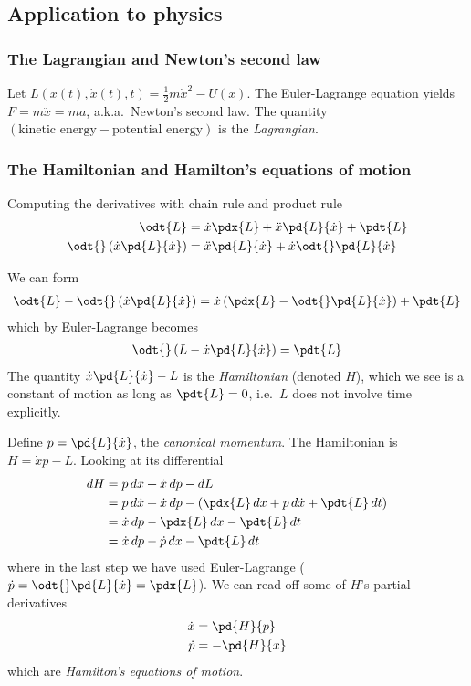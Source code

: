 \documentclass[12pt, oneside, letterpaper, fleqn]{article}
\begin{document}
\subsection{Application to physics}
\subsubsection{The Lagrangian and Newton's second law}
Let $L(x(t), \dot{x}(t), t) = \frac{1}{2}m\dot{x}^2 - U(x)$. The
Euler-Lagrange equation yields $F = m\ddot{x} = ma$, a.k.a.\ Newton's
second law. The quantity $(\text{kinetic energy} - \text{potential
energy})$ is the \emph{Lagrangian}.

\subsubsection{The Hamiltonian and Hamilton's equations of motion}
Computing the derivatives with chain rule and product rule
\begin{align*}
\odt{L} &= \dot{x}\pdx{L} + \ddot{x}\pd{L}{\dot{x}} + \pdt{L}\\
\odt{}\left(\dot{x}\pd{L}{\dot{x}}\right) &= \ddot{x}\pd{L}{\dot{x}} +
\dot{x}\odt{}\pd{L}{\dot{x}}
\end{align*}

We can form
\begin{align*}
\odt{L} - \odt{}\left(\dot{x}\pd{L}{\dot{x}}\right) =
\dot{x}\left(\pdx{L} - \odt{}\pd{L}{\dot{x}}\right) + \pdt{L}
\end{align*}
which by Euler-Lagrange becomes
\begin{align*}
\odt{}\left(L - \dot{x}\pd{L}{\dot{x}}\right) = \pdt{L}
\end{align*}
The quantity $\dot{x}\pd{L}{\dot{x}} - L$ is the
\emph{Hamiltonian} (denoted $H$), which we see is a constant of motion
as long as $\pdt{L} = 0$, i.e.\ $L$ does not involve time explicitly.

Define $p = \pd{L}{\dot{x}}$, the \emph{canonical momentum}. The
Hamiltonian is $H = \dot{x}p - L$. Looking at its differential
\begin{align*}
dH &= p\,d\dot{x} + \dot{x}\,dp - dL\\
&= p\,d\dot{x} + \dot{x}\,dp - \left(\pdx{L}\,dx + p\,d\dot{x} +
\pdt{L}\,dt\right)\\
&= \dot{x}\,dp - \pdx{L}\,dx - \pdt{L}\,dt\\
&= \dot{x}\,dp - \dot{p}\,dx - \pdt{L}\,dt
\end{align*}
where in the last step we have used Euler-Lagrange ($\dot{p} =
\odt{}\pd{L}{\dot{x}} = \pdx{L}$). We can read off some of $H$'s partial
derivatives
\begin{align}\begin{split}\label{eq:hamilton}
\dot{x} &= \pd{H}{p}\\
\dot{p} &= -\pd{H}{x}
\end{split}\end{align}
which are \emph{Hamilton's equations of motion}.
\end{document}
